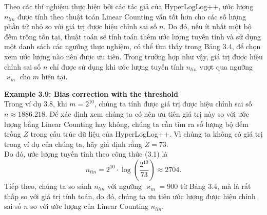 \documentclass[letterpaper,13pt]{article}
\theoremstyle{mytheor}
\begin{document}
\indent Theo các thí nghiệm thực hiện bởi các tác giả của HyperLogLog++, ước lượng $n_{lin}$ được tính theo thuật toán 
Linear Counting vẫn tốt hơn cho các số lượng phần tử nhỏ so với giá trị được hiệu chỉnh sai số $n$. Do đó, nếu ít nhất một bộ đếm trống tồn tại, 
thuật toán sẽ tính toán thêm ước lượng tuyến tính và sử dụng một danh sách các ngưỡng thực nghiệm, có thể tìm thấy trong Bảng 3.4, để chọn xem ước lượng 
nào nên được ưu tiên. Trong trường hợp như vậy, giá trị được hiệu chỉnh sai số $n$ chỉ được sử dụng khi ước lượng tuyến tính $n_{lin}$ 
vượt qua ngưỡng $\varkappa_m$ cho $m$ hiện tại.
\begin{mdframed}
    \vspace{0.25cm}
    \textbf{Example 3.9: Bias correction with the threshold}\\
    Trong ví dụ 3.8, khi $m = 2^{10}$, chúng ta tính được giá trị được hiệu chỉnh sai số $n \approx 1886.218$. Để xác định xem chúng ta có nên 
    ưu tiên giá trị này so với ước lượng bằng Linear Counting hay không, chúng ta cần tìm ra số lượng bộ đếm trống $Z$ trong cấu trúc dữ liệu của 
    HyperLogLog++. Vì chúng ta không có giá trị trong ví dụ của chúng ta, hãy giả định rằng $Z = 73$.\\
    Do đó, ước lượng tuyến tính theo công thức (3.1) là
    \[n_{lin} = 2^{10} \cdot \log\left(\frac{2^{10}}{73}\right) \approx 2704.\]
    Tiếp theo, chúng ta so sánh $n_{lin}$ với ngưỡng $\varkappa_m = 900$ từ Bảng 3.4, mà là rất thấp so với giá trị tính toán, do đó, 
    chúng ta ưu tiên ước lượng được hiệu chỉnh sai số $n$ so với ước lượng của Linear Counting $n_{lin}$.
    
\end{mdframed}
    
\end{document}
